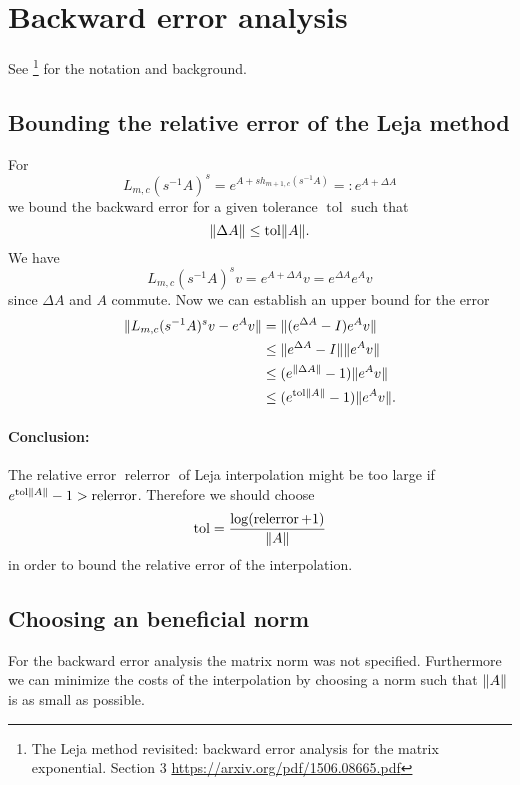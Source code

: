 \documentclass{scrartcl}
\newcommand{\eqdefn}{=\mathrel{\mathop:}}
\DeclarePairedDelimiter\norm{\lVert}{\rVert}%
\begin{document}
\section{Backward error analysis}
See \footnote{The Leja method revisited: backward error analysis for the matrix exponential. Section 3 \url{https://arxiv.org/pdf/1506.08665.pdf}} for the notation and background.
\subsection{Bounding the relative error of the Leja method}
For
\[
	L_{m,c}(s^{-1}A)^s = e^{A+sh_{m+1,c}(s^{-1}A)} \eqdefn e^{A + \Delta A} 
\]
we bound the backward error for a given tolerance $\operatorname{tol}$ such that
\[\norm{\Delta A} \le \operatorname{tol}\norm{A}.\]
We have
\[
	L_{m,c}(s^{-1}A)^sv = e^{A + \Delta A}v = e^{\Delta A}e^{A}v
\]
since $\Delta A$ and $A$ commute. Now we can establish an upper bound for the error
\begin{align*}
	\norm{L_{m,c}(s^{-1}A)^sv - e^Av} &= \norm{(e^{\Delta A}-I) e^{A}v} \\
	&\le
	\norm{e^{\Delta A}-I} \norm{e^{A}v} \\
	&\le (e^{\norm{\Delta A}}-1) \norm{e^{A}v} \\ 
	&\le (e^{\operatorname{tol}\norm{A}}-1) \norm{e^{A}v}.
\end{align*}

\paragraph{Conclusion:} The relative error $\operatorname{relerror}$ of Leja interpolation might be too large if\\ $e^{\operatorname{tol}\norm{A}}-1 > \operatorname{relerror}$. Therefore we should choose
\[\operatorname{tol} = \frac{\log(\operatorname{relerror} + 1)}{\norm{A}} \]
in order to bound the relative error of the interpolation.

\subsection{Choosing an beneficial norm}
For the backward error analysis the matrix norm was not specified. Furthermore we can minimize the costs of the interpolation by choosing a norm such that $\norm{A}$ is as small as possible.
\end{document}
